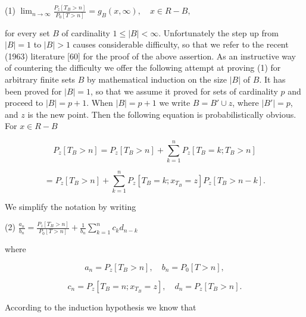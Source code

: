 (1) $\lim_{n \to \infty} \frac{P_z[T_B > n]}{P_0[T > n]} = g_B(x, \infty), \quad x \in R - B,$

for every set $B$ of cardinality $1 \leq |B| < \infty$. Unfortunately the step up from $|B| = 1$ to $|B| > 1$ causes considerable difficulty, so that we refer to the recent (1963) literature [60] for the proof of the above assertion. As an instructive way of countering the difficulty we offer the following attempt at proving (1) for arbitrary finite sets $B$ by mathematical induction on the size $|B|$ of $B$. It has been proved for $|B| = 1$, so that we assume it proved for sets of cardinality $p$ and proceed to $|B| = p + 1$. When $|B| = p + 1$ we write $B = B' \cup z$, where $|B'| = p$, and $z$ is the new point. Then the following equation is probabilistically obvious. For $x \in R - B$

$$P_z[T_B > n] = P_z[T_B > n] + \sum_{k=1}^{n} P_z[T_B = k; T_B > n]$$

$$= P_z[T_B > n] + \sum_{k=1}^{n} P_z[T_B = k; x_{T_B} = z] P_z[T_B > n - k].$$

We simplify the notation by writing

(2) $\frac{a_n}{b_n} = \frac{P_z[T_B > n]}{P_0[T > n]} + \frac{1}{b_n} \sum_{k=1}^{n} c_k d_{n-k}$

where

$$a_n = P_z[T_B > n], \quad b_n = P_0[T > n],$$

$$c_n = P_z[T_B = n; x_{T_B} = z], \quad d_n = P_z[T_B > n].$$

According to the induction hypothesis we know that


